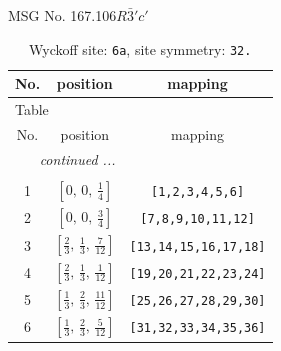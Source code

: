 \documentclass[fleqn,8pt]{jsarticle}
\begin{document}
\setcounter{MaxMatrixCols}{32}

\renewcommand{\tablename}{Table~}
\renewcommand{\figurename}{Figure~}
\begin{center}
\LARGE
MSG No. 167.106\quad$R\bar{3}'c'$
\end{center}
\renewcommand{\arraystretch}{1.2}
\begin{longtable}{ccc}
\caption{Wyckoff site: {\tt 6a}, site symmetry: {\tt 32.}}
 \\
 \hline \hline
No. & position & mapping \\ \hline \endfirsthead

\multicolumn{2}{l}{\tablename\ \thetable{}} \\
 \hline \hline
No. & position & mapping \\ \hline \endhead

 \hline \hline
\multicolumn{2}{r}{\footnotesize\it continued ...} \\ \endfoot

 \hline \hline
\multicolumn{2}{r}{} \\ \endlastfoot

1 & $\left[ 0,\, 0,\, \frac{1}{4} \right]$ & {\tt [1,2,3,4,5,6]} \\ \hline
2 & $\left[ 0,\, 0,\, \frac{3}{4} \right]$ & {\tt [7,8,9,10,11,12]} \\ \hline
3 & $\left[ \frac{2}{3},\, \frac{1}{3},\, \frac{7}{12} \right]$ & {\tt [13,14,15,16,17,18]} \\ \hline
4 & $\left[ \frac{2}{3},\, \frac{1}{3},\, \frac{1}{12} \right]$ & {\tt [19,20,21,22,23,24]} \\ \hline
5 & $\left[ \frac{1}{3},\, \frac{2}{3},\, \frac{11}{12} \right]$ & {\tt [25,26,27,28,29,30]} \\ \hline
6 & $\left[ \frac{1}{3},\, \frac{2}{3},\, \frac{5}{12} \right]$ & {\tt [31,32,33,34,35,36]} \\
\end{longtable}
\renewcommand{\arraystretch}{1.2}
\end{document}
